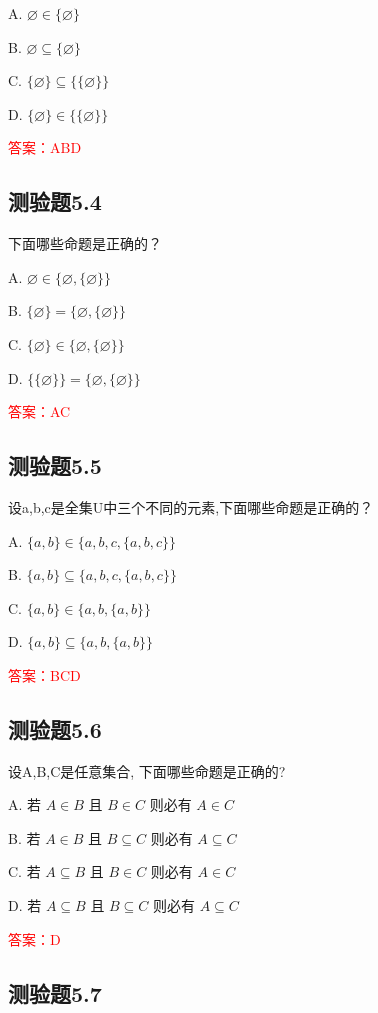 \documentclass[UTF8, heading=true]{ctexart}
\begin{document}
A. 
$
\varnothing \in\{\varnothing\}
$

B. 
$
\varnothing \subseteq\{\varnothing\}
$

C. 
$
\{\varnothing\} \subseteq\{\{\varnothing\}\}
$

D. 
$
\{\varnothing\} \in\{\{\varnothing\}\}
$

\textcolor{red}{答案：ABD}


\subsection{测验题5.4}
下面哪些命题是正确的？

A. $\varnothing \in\{\varnothing,\{\varnothing\}\}$

B. $\{\varnothing\}=\{\varnothing,\{\varnothing\}\}$

C. $\{\varnothing\} \in\{\varnothing,\{\varnothing\}\}$

D. $\{\{\varnothing\}\}=\{\varnothing,\{\varnothing\}\}$

\textcolor{red}{答案：AC}

\subsection{测验题5.5}
设a,b,c是全集U中三个不同的元素,下面哪些命题是正确的？

A. $\{a, b\} \in\{a, b, c,\{a, b, c\}\}$

B. $\{a, b\} \subseteq\{a, b, c,\{a, b, c\}\}$

C. $\{a, b\} \in\{a, b,\{a, b\}\}$

D. $\{a, b\} \subseteq\{a, b,\{a, b\}\}$

\textcolor{red}{答案：BCD}

\subsection{测验题5.6}
设A,B,C是任意集合, 下面哪些命题是正确的?

A. 
若 $A \in B$ 且 $B \in C$ 则必有 $A \in C$

B. 
若 $A \in B$ 且 $B \subseteq C$ 则必有 $A \subseteq C$

C. 
若 $A \subseteq B$ 且 $B \in C$ 则必有 $A \in C$

D. 
若 $A \subseteq B$ 且 $B \subseteq C$ 则必有 $A \subseteq C$

\textcolor{red}{答案：D}

\subsection{测验题5.7}
\end{document}

